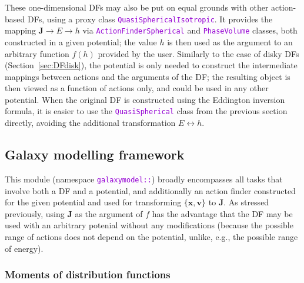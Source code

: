 \documentclass[12pt]{article}
\newcommand{\ttt}[1]{\textcolor{darkviolet}{\texttt{#1}}}
\newcommand{\bv}{\boldsymbol{v}}
\newcommand{\bx}{\boldsymbol{x}}
\newcommand{\bJ}{\boldsymbol{J}}
\begin{document}
These one-dimensional DFs may also be put on equal grounds with other action-based DFs, using a proxy class \ttt{QuasiSphericalIsotropic}. It provides the mapping $\bJ \to E \to h$ via \ttt{ActionFinderSpherical} and \ttt{PhaseVolume} classes, both constructed in a given potential; the value $h$ is then used as the argument to an arbitrary function $f(h)$ provided by the user. Similarly to the case of disky DFs (Section~\ref{sec:DFdisk}), the potential is only needed to construct the intermediate mappings between actions and the arguments of the DF; the resulting object is then viewed as a function of actions only, and could be used in any other potential.
When the original DF is constructed using the Eddington inversion formula, it is easier to use the \ttt{QuasiSpherical} class from the previous section directly, avoiding the additional transformation $E\leftrightarrow h$.


\subsection{Galaxy modelling framework}  \label{sec:GalaxyModel}

This module (namespace \ttt{galaxymodel::}) broadly encompasses all tasks that involve both a DF and a potential, and additionally an action finder constructed for the given potential and used for transforming $\{\bx,\bv\}$ to $\bJ$.
As stressed previously, using $\bJ$ as the argument of $f$ has the advantage that the DF may be used with an arbitrary potenial without any modifications (because the possible range of actions does not depend on the potential, unlike, e.g., the possible range of energy).


\subsubsection{Moments of distribution functions}  \label{sec:Moments}
\end{document}
